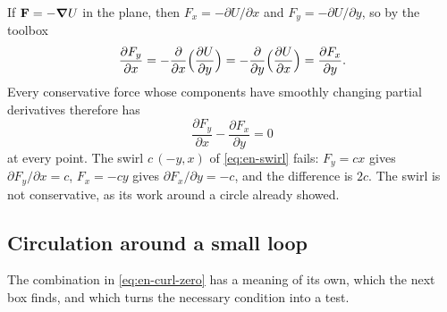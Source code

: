 If $\bm{\mathrm{F}} = -\bm{\nabla} U$ in the plane, then $F_x = -\partial U/\partial x$
and $F_y = -\partial U/\partial y$, so by the toolbox
\begin{equation*}
   \frac{\partial F_y}{\partial x}
   = -\frac{\partial}{\partial x}\Bigl(\frac{\partial U}{\partial y}\Bigr)
   = -\frac{\partial}{\partial y}\Bigl(\frac{\partial U}{\partial x}\Bigr)
   = \frac{\partial F_x}{\partial y} .
\end{equation*}
Every conservative force whose components have smoothly changing partial
derivatives therefore has
\begin{equation}
   \frac{\partial F_y}{\partial x} - \frac{\partial F_x}{\partial y} = 0
   \label{eq:en-curl-zero}
\end{equation}
at every point. The swirl $c\,(-y, x)$ of \cref{eq:en-swirl} fails: $F_y
= cx$ gives $\partial F_y/\partial x = c$, $F_x = -cy$ gives $\partial
F_x/\partial y = -c$, and the difference is $2c$. The swirl is not
conservative, as its work around a circle already showed.

\subsection*{Circulation around a small loop}

The combination in \cref{eq:en-curl-zero} has a meaning of its own, which
the next box finds, and which turns the necessary condition into a test.

